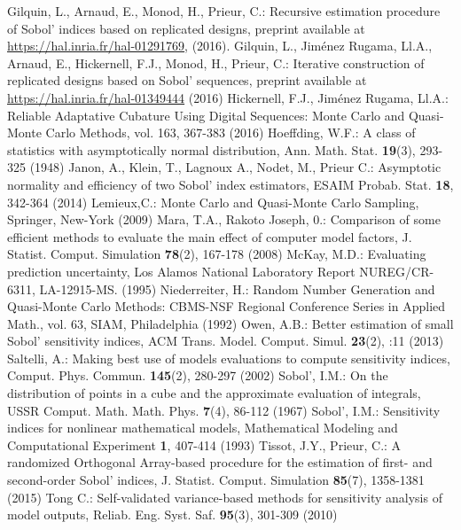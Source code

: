 
\begin{thebibliography}{99}
%
%
Gilquin, L., Arnaud, E., Monod, H., Prieur, C.: Recursive estimation procedure of Sobol' indices based on replicated designs, preprint available at \url{https://hal.inria.fr/hal-01291769}, (2016).
Gilquin, L., Jim\'enez Rugama, Ll.A., Arnaud, E., Hickernell, F.J., Monod, H., Prieur, C.: Iterative construction of replicated designs based on Sobol' sequences, preprint available at \url{https://hal.inria.fr/hal-01349444} (2016)
Hickernell, F.J., Jim\'enez Rugama, Ll.A.: Reliable Adaptative Cubature Using Digital Sequences: Monte Carlo and Quasi-Monte Carlo Methods, vol. 163, 367-383 (2016)
Hoeffding, W.F.: A class of statistics with asymptotically normal distribution, Ann. Math. Stat. \textbf{19}(3), 293-325 (1948)
Janon, A., Klein, T., Lagnoux A., Nodet, M., Prieur C.: Asymptotic normality and efficiency of two {S}obol' index estimators, ESAIM Probab. Stat. \textbf{18}, 342-364 (2014)
Lemieux,C.: Monte Carlo and Quasi-Monte Carlo Sampling, Springer, New-York (2009)
Mara, T.A., Rakoto Joseph, 0.: Comparison of some efficient methods to evaluate the main effect of computer model factors, J. Statist. Comput. Simulation \textbf{78}(2), 167-178 (2008)
McKay, M.D.: Evaluating prediction uncertainty, Los Alamos National Laboratory Report NUREG/CR- 6311, LA-12915-MS. (1995)
Niederreiter, H.: Random Number Generation and Quasi-Monte Carlo Methods: CBMS-NSF Regional Conference Series in Applied Math., vol. 63, SIAM, Philadelphia (1992)
Owen, A.B.: Better estimation of small Sobol' sensitivity indices, ACM Trans. Model. Comput. Simul. \textbf{23}(2), :11 (2013)
Saltelli, A.: Making best use of models evaluations to compute sensitivity indices, Comput. Phys. Commun. \textbf{145}(2), 280-297 (2002)
Sobol', I.M.: On the distribution of points in a cube and the approximate evaluation of integrals, USSR Comput. Math. Math. Phys. \textbf{7}(4), 86-112 (1967)
Sobol', I.M.: Sensitivity indices for nonlinear mathematical models, Mathematical Modeling and Computational Experiment \textbf{1}, 407-414 (1993)
Tissot, J.Y., Prieur, C.: A randomized Orthogonal Array-based procedure for the estimation of first- and second-order Sobol' indices, J. Statist. Comput. Simulation \textbf{85}(7), 1358-1381 (2015)
Tong C.: Self-validated variance-based methods for sensitivity analysis of model outputs, Reliab. Eng. Syst. Saf. \textbf{95}(3), 301-309 (2010)

\end{thebibliography}


